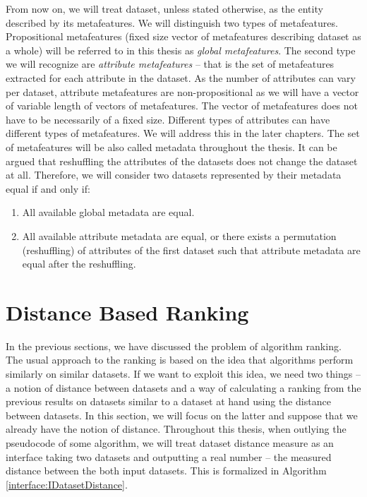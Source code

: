 From now on, we will treat dataset, unless stated otherwise, as the entity described by its metafeatures. We will distinguish two types of metafeatures. Propositional metafeatures (fixed size vector of metafeatures describing dataset as a whole) will be referred to in this thesis as \emph{global metafeatures}. The second type we will recognize are \emph{attribute metafeatures} -- that is the set of metafeatures extracted for each attribute in the dataset. As the number of attributes can vary per dataset, attribute metafeatures are non-propositional as we will have a vector of variable length of vectors of metafeatures. The vector of metafeatures does not have to be necessarily of a fixed size. Different types of attributes can have different types of metafeatures. We will address this in the later chapters.
The set of metafeatures will be also called metadata throughout the thesis. It can be argued that reshuffling the attributes of the datasets does not change the dataset at all. Therefore, we will consider two datasets represented by their metadata equal if and only if:
\begin{enumerate}
	\item All available global metadata are equal.
	\item All available attribute metadata are equal, or there exists a permutation (reshuffling) of attributes of the first dataset such that attribute metadata are equal after the reshuffling.
\end{enumerate}

\section{Distance Based Ranking}
\label{section:distanceBasedRanking}
In the previous sections, we have discussed the problem of algorithm ranking. The usual approach to the ranking is based on the idea that algorithms perform similarly on similar datasets. If we want to exploit this idea, we need two things -- a notion of distance between datasets and a way of calculating a ranking from the previous results on datasets similar to a dataset at hand using the distance between datasets.
In this section, we will focus on the latter and suppose that we already have the notion of distance. Throughout this thesis, when outlying the pseudocode of some algorithm, we will treat dataset distance measure as an interface taking two datasets and outputting a real number -- the measured distance between the both input datasets. This is formalized in Algorithm \ref{interface:IDatasetDistance}.

